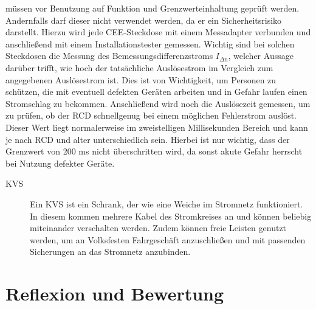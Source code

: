 müssen vor Benutzung auf Funktion und Grenzwerteinhaltung geprüft werden. Andernfalls darf dieser nicht verwendet werden, da er ein Sicherheitsrisiko 
darstellt. Hierzu wird jede CEE-Steckdose mit einem Messadapter verbunden und anschließend mit einem Installationstester gemessen. Wichtig sind bei solchen 
Steckdosen die Messung des Bemessungsdifferenzstroms $I_{\Delta \text{n}}$, welcher Aussage darüber trifft, wie hoch der tatsächliche Auslösestrom im Vergleich zum 
angegebenen Auslösestrom ist. Dies ist von Wichtigkeit, um Personen zu schützen, die mit eventuell defekten Geräten arbeiten und in Gefahr laufen einen 
Stromschlag zu bekommen. Anschließend wird noch die Auslösezeit gemessen, um zu prüfen, ob der RCD schnellgenug bei einem möglichen Fehlerstrom auslöst.
Dieser Wert liegt normalerweise im zweistelligen Millisekunden Bereich und kann je nach RCD und alter unterschiedlich sein. Hierbei ist nur wichtig, dass 
der Grenzwert von 200 ms nicht überschritten wird, da sonst akute Gefahr herrscht bei Nutzung defekter Geräte. %
\begin{description}
\item[KVS] Ein KVS ist ein Schrank, der wie eine Weiche im Stromnetz funktioniert. In diesem kommen mehrere Kabel des Stromkreises an und können beliebig 
miteinander verschalten werden. Zudem können freie Leisten genutzt werden, um \zB an Volksfesten Fahrgeschäft anzuschließen und mit passenden Sicherungen 
an das Stromnetz anzubinden.
\end{description}

\section{Reflexion und Bewertung}

